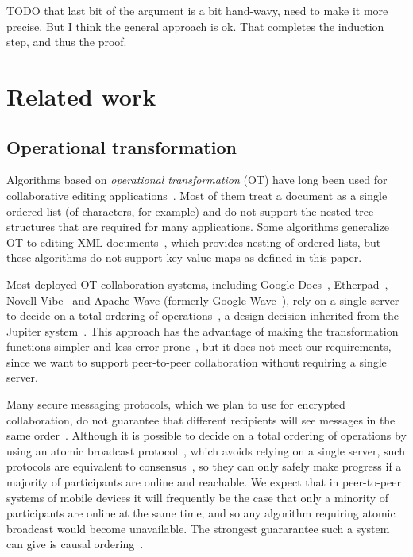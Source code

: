 \documentclass[a4paper,twocolumn,10pt]{article}
\begin{document}
TODO that last bit of the argument is a bit hand-wavy, need to make it more precise. But I think the general approach is ok. That completes the induction step, and thus the proof.

\fi %

\section{Related work}

\subsection{Operational transformation}

Algorithms based on \emph{operational transformation} (OT) have long been used for collaborative editing applications~\cite{Ellis:1989ue,Ressel:1996wx,Sun:1998vf,Nichols:1995fd}. Most of them treat a document as a single ordered list (of characters, for example) and do not support the nested tree structures that are required for many applications. Some algorithms generalize OT to editing XML documents~\cite{Davis:2002iv,Ignat:2003jy,Wang:2015vo}, which provides nesting of ordered lists, but these algorithms do not support key-value maps as defined in this paper.

Most deployed OT collaboration systems, including Google Docs~\cite{DayRichter:2010tt}, Etherpad~\cite{Etherpad:2011um}, Novell Vibe~\cite{Spiewak:2010vw} and Apache Wave (formerly Google Wave~\cite{Wang:2015vo}), rely on a single server to decide on a total ordering of operations~\cite{Lemonik:2016wh}, a design decision inherited from the Jupiter system~\cite{Nichols:1995fd}. This approach has the advantage of making the transformation functions simpler and less error-prone~\cite{Imine:2003ks}, but it does not meet our requirements, since we want to support peer-to-peer collaboration without requiring a single server.

Many secure messaging protocols, which we plan to use for encrypted collaboration, do not guarantee that different recipients will see messages in the same order~\cite{Unger:2015kg}. Although it is possible to decide on a total ordering of operations by using an atomic broadcast protocol~\cite{Defago:2004ji}, which avoids relying on a single server, such protocols are equivalent to consensus~\cite{Chandra:1996cp}, so they can only safely make progress if a majority of participants are online and reachable. We expect that in peer-to-peer systems of mobile devices it will frequently be the case that only a minority of participants are online at the same time, and so any algorithm requiring atomic broadcast would become unavailable. The strongest guararantee such a system can give is causal ordering~\cite{Attiya:2015dm}.
\end{document}
